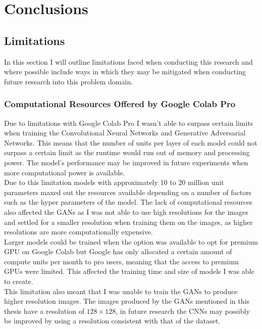 \chapter{Conclusions}
\section{Limitations}
In this section I will outline limitations faced when conducting this research and where possible include ways in which they may be mitigated when conducting future research into this problem domain.
\subsection{Computational Resources Offered by Google Colab Pro}
Due to limitations with Google Colab Pro I wasn't able to surpass certain limits when training the Convolutional Neural Networks and Generative Adversarial Networks.  This means that the number of units per layer of each model could not surpass a certain limit as the runtime would run out of memory and processing power.  The model's performance may be improved in future experiments when more computational power is available.   
\\
Due to this limitation models with approximately 10 to 20 million unit parameters maxed out the resources available depending on a number of factors such as the hyper parameters of the model.  The lack of computational resources also affected the GANs as I was not able to use high resolutions for the images and settled for a smaller resolution when training them on the images, as higher resolutions are more computationally expensive.
\\
Larger models could be trained when the option was available to opt for premium GPU on Google Colab but Google has only allocated a certain amount of compute units per month to pro users, meaning that the access to premium GPUs were limited.  This affected the training time and size of models I was able to create.
\\
This limitation also meant that I was unable to train the GANs to produce higher resolution images.  The images produced by the GANs mentioned in this thesis have a resolution of $128\times128$, in future research the CNNs may possibly be improved by using a resolution consistent with that of the dataset.
